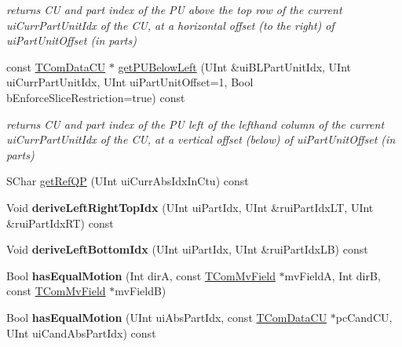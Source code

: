 \begin{DoxyCompactItemize}
\begin{DoxyCompactList}\small\item\em returns CU and part index of the PU above the top row of the current ui\+Curr\+Part\+Unit\+Idx of the CU, at a horizontal offset (to the right) of ui\+Part\+Unit\+Offset (in parts) \end{DoxyCompactList}\item 
\mbox{\label{class_t_com_data_c_u_acd64e7fd5eb897036a217ca86c819e16}} 
const \hyperlink{class_t_com_data_c_u}{T\+Com\+Data\+CU} $\ast$ \hyperlink{class_t_com_data_c_u_acd64e7fd5eb897036a217ca86c819e16}{get\+P\+U\+Below\+Left} (U\+Int \&ui\+B\+L\+Part\+Unit\+Idx, U\+Int ui\+Curr\+Part\+Unit\+Idx, U\+Int ui\+Part\+Unit\+Offset=1, Bool b\+Enforce\+Slice\+Restriction=true) const
\begin{DoxyCompactList}\small\item\em returns CU and part index of the PU left of the lefthand column of the current ui\+Curr\+Part\+Unit\+Idx of the CU, at a vertical offset (below) of ui\+Part\+Unit\+Offset (in parts) \end{DoxyCompactList}\item 
S\+Char \hyperlink{class_t_com_data_c_u_a6106f12fbae81a13060b0587c5a5458f}{get\+Ref\+QP} (U\+Int ui\+Curr\+Abs\+Idx\+In\+Ctu) const
\item 
\mbox{\label{class_t_com_data_c_u_ab938502165f73eedce541965cc3dd085}} 
Void {\bfseries derive\+Left\+Right\+Top\+Idx} (U\+Int ui\+Part\+Idx, U\+Int \&rui\+Part\+Idx\+LT, U\+Int \&rui\+Part\+Idx\+RT) const
\item 
\mbox{\label{class_t_com_data_c_u_afd942604aaaf29dc70c55f38ecc5de0e}} 
Void {\bfseries derive\+Left\+Bottom\+Idx} (U\+Int ui\+Part\+Idx, U\+Int \&rui\+Part\+Idx\+LB) const
\item 
\mbox{\label{class_t_com_data_c_u_ac36c477a22b90b32a62901dee691630d}} 
Bool {\bfseries has\+Equal\+Motion} (Int dirA, const \hyperlink{class_t_com_mv_field}{T\+Com\+Mv\+Field} $\ast$mv\+FieldA, Int dirB, const \hyperlink{class_t_com_mv_field}{T\+Com\+Mv\+Field} $\ast$mv\+FieldB)
\item 
\mbox{\label{class_t_com_data_c_u_a073cc1f61ccd1a2fe5d21def067eab3c}} 
Bool {\bfseries has\+Equal\+Motion} (U\+Int ui\+Abs\+Part\+Idx, const \hyperlink{class_t_com_data_c_u}{T\+Com\+Data\+CU} $\ast$pc\+Cand\+CU, U\+Int ui\+Cand\+Abs\+Part\+Idx) const

\end{DoxyCompactItemize}
